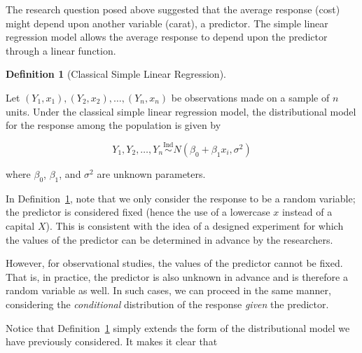 \documentclass[
  letterpaper,
  DIV=11,
  numbers=noendperiod]{scrreprt}
\theoremstyle{definition}
\newtheorem{definition}{Definition}[chapter]
\theoremstyle{plain}
\theoremstyle{definition}
\theoremstyle{remark}
\begin{document}
The research question posed above suggested that the average response
(cost) might depend upon another variable (carat), a predictor. The
simple linear regression model allows the average response to depend
upon the predictor through a linear function.

\begin{definition}[Classical Simple Linear
Regression]\protect\hypertarget{def-classical-simple-regression}{}\label{def-classical-simple-regression}

Let
\(\left(Y_1, x_1\right), \left(Y_2, x_2\right), \dotsc, \left(Y_n, x_n\right)\)
be observations made on a sample of \(n\) units. Under the classical
simple linear regression model, the distributional model for the
response among the population is given by

\[Y_1, Y_2, \dotsc, Y_n \stackrel{\text{Ind}}{\sim} N\left(\beta_0 + \beta_1 x_i, \sigma^2\right)\]

where \(\beta_0\), \(\beta_1\), and \(\sigma^2\) are unknown parameters.

\end{definition}

\begin{tcolorbox}[enhanced jigsaw, rightrule=.15mm, leftrule=.75mm, opacityback=0, coltitle=black, bottomrule=.15mm, opacitybacktitle=0.6, left=2mm, colframe=quarto-callout-note-color-frame, breakable, colback=white, arc=.35mm, toprule=.15mm, toptitle=1mm, bottomtitle=1mm, title=\textcolor{quarto-callout-note-color}{\faInfo}\hspace{0.5em}{Note}, titlerule=0mm, colbacktitle=quarto-callout-note-color!10!white]

In Definition~\ref{def-classical-simple-regression}, note that we only
consider the response to be a random variable; the predictor is
considered fixed (hence the use of a lowercase \(x\) instead of a
capital \(X\)). This is consistent with the idea of a designed
experiment for which the values of the predictor can be determined in
advance by the researchers.

However, for observational studies, the values of the predictor cannot
be fixed. That is, in practice, the predictor is also unknown in advance
and is therefore a random variable as well. In such cases, we can
proceed in the same manner, considering the \emph{conditional}
distribution of the response \emph{given} the predictor.

\end{tcolorbox}

Notice that Definition~\ref{def-classical-simple-regression} simply
extends the form of the distributional model we have previously
considered. It makes it clear that
\end{document}
